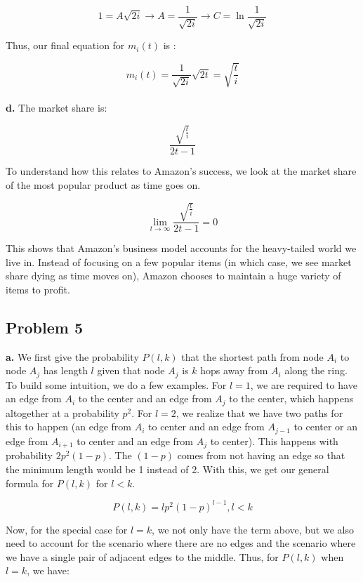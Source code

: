 \documentclass[12 pt]{article}
\begin{document}
	\[1 = A\sqrt{2i} \longrightarrow A = \frac{1}{\sqrt{2i}} \rightarrow C = \ln \frac{1}{\sqrt{2i}} \]
	
	\noindent Thus, our final equation for $m_i(t)$ is :
	
	\[m_i(t) = \frac{1}{\sqrt{2i}} \sqrt{2t} = \sqrt{\frac{t}{i}}\] \\
	
	\noindent \textbf {d.} The market share is: 
	
	\[\frac{\sqrt{\frac{t}{i}}} {2t-1} \]
	
	\noindent To understand how this relates to Amazon's success, we look at the market share of the most popular product as time goes on.
	
	\[\lim_{t\rightarrow \infty}\frac{\sqrt{\frac{t}{i}}} {2t-1} = 0\]
	
	\noindent This shows that Amazon's business model accounts for the heavy-tailed world we live in. Instead of focusing on a few popular items (in which case, we see market share dying as time moves on), Amazon chooses to maintain a huge variety of items to profit. \\
	
	\subsection*{Problem 5}
	\noindent \textbf {a.} We first give the probability $P(l,k)$ that the shortest path from node $A_i$ to node $A_j$ has length $l$ given that node $A_j$ is $k$ hops away from $A_i$ along the ring. To build some intuition, we do a few examples. For $l = 1$, we are required to have an edge from $A_i$ to the center and an edge from $A_j$ to the center, which happens altogether at a probability $p^2$. For $l = 2$, we realize that we have two paths for this to happen (an edge from $A_i$ to center and an edge from $A_{j-1}$ to center or an edge from $A_{i+1}$ to center and an edge from $A_j$ to center). This happens with probability $2p^2(1-p)$. The $(1-p)$ comes from not having an edge so that the minimum length would be 1 instead of 2. With this, we get our general formula for $P(l,k)$ for $l < k$. 
	
	\[P(l,k) = lp^2(1-p)^{l-1}, l < k\]
	
	\noindent Now, for the special case for $l = k$, we not only have the term above, but we also need to account for the scenario where there are no edges and the scenario where we have a single pair of adjacent edges to the middle. Thus, for $P(l,k)$ when $l = k$, we have:
	
\end{document}
